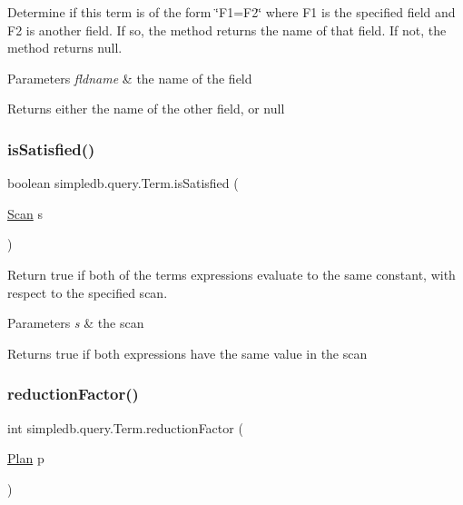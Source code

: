 Determine if this term is of the form \char`\"{}\+F1=\+F2\char`\"{} where F1 is the specified field and F2 is another field. If so, the method returns the name of that field. If not, the method returns null. 
\begin{DoxyParams}{Parameters}
{\em fldname} & the name of the field \\
\hline
\end{DoxyParams}
\begin{DoxyReturn}{Returns}
either the name of the other field, or null 
\end{DoxyReturn}
\mbox{\label{classsimpledb_1_1query_1_1Term_a197592ae9c263bbfb91ac948c6c90b35}} 
\subsubsection{\texorpdfstring{is\+Satisfied()}{isSatisfied()}}
{\footnotesize\ttfamily boolean simpledb.\+query.\+Term.\+is\+Satisfied (\begin{DoxyParamCaption}\item[{\hyperlink{interfacesimpledb_1_1query_1_1Scan}{Scan}}]{s }\end{DoxyParamCaption})\hspace{0.3cm}{\ttfamily [inline]}}

Return true if both of the term\textquotesingle{}s expressions evaluate to the same constant, with respect to the specified scan. 
\begin{DoxyParams}{Parameters}
{\em s} & the scan \\
\hline
\end{DoxyParams}
\begin{DoxyReturn}{Returns}
true if both expressions have the same value in the scan 
\end{DoxyReturn}
\mbox{\label{classsimpledb_1_1query_1_1Term_a6d48a55de2d5b3a475cd42fc93c36010}} 
\subsubsection{\texorpdfstring{reduction\+Factor()}{reductionFactor()}}
{\footnotesize\ttfamily int simpledb.\+query.\+Term.\+reduction\+Factor (\begin{DoxyParamCaption}\item[{\hyperlink{interfacesimpledb_1_1plan_1_1Plan}{Plan}}]{p }\end{DoxyParamCaption})\hspace{0.3cm}{\ttfamily [inline]}}


